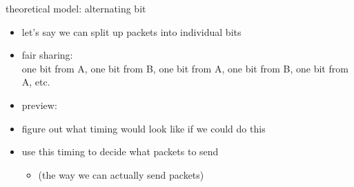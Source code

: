 \usetikzlibrary{arrows.meta,matrix}
\begin{frame}{theoretical model: alternating bit}
    \begin{itemize}
    \item let's say we can split up packets into individual bits
    \item fair sharing: \\
    one bit from A, one bit from B, one bit from A, one bit from B, one bit from A, etc.
    \vspace{.5cm}
    \item preview:
    \item figure out what timing would look like if we could do this
    \item use this timing to decide what packets to send 
        \begin{itemize}
        \item (the way we can actually send packets)
        \end{itemize}
    \end{itemize}
\end{frame}

